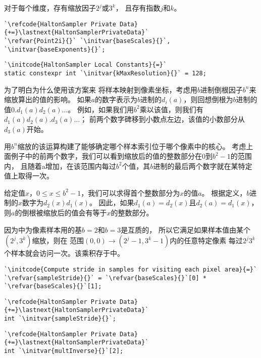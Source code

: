 对于每个维度，存有缩放因子$2^j$或$3^k$，
且存有指数$j$和$k$。
\begin{lstlisting}
`\refcode{HaltonSampler Private Data}{+=}\lastnext{HaltonSamplerPrivateData}`
`\refvar{Point2i}{}` `\initvar{baseScales}{}`, `\initvar{baseExponents}{}`;
\end{lstlisting}
\begin{lstlisting}
`\initcode{HaltonSampler Local Constants}{=}`
static constexpr int `\initvar{kMaxResolution}{}` = 128;
\end{lstlisting}

为了明白为什么使用该方案来
将样本映射到像素坐标，考虑用$b$进制倒根因子$b^n$来缩放算出的值的影响。
如果$a$的数字表示为$b$进制的$d_i(a)$，则回想倒根为$b$进制的值$0.d_1(a)d_2(a)\ldots$。
例如，如果我们用$b^2$乘以该值，则我们有$d_1(a)d_2(a).d_3(a)\ldots$；
前两个数字碑移到小数点左边，该值的小数部分从$d_3(a)$开始。

用$b^n$缩放的该运算构建了能够确定哪个样本索引位于哪个像素中的核心。
考虑上面例子中的前两个数字，我们可以看到缩放后的值的整数部分在0到$b^2-1$的范围内，
且随着a增加，在该范围内每过$b^2$个值，其$b$进制的最后两个数字就在某特定值上取得一次。

给定值$x$，$0\le x\le b^2-1$，我们可以求得首个整数部分为$x$的值$a$。
根据定义，$b$进制的$x$数字为$d_2(x)d_1(x)$。
因此，如果$d_1(a)=d_2(x)$且$d_2(a)=d_1(x)$，
则$a$的倒根被缩放后的值会有等于$x$的整数部分。

因为中为像素样本用的基$b=2$和$b=3$是互质的，
所以它满足如果样本值由某个$(2^j,3^k)$缩放，则在
范围$(0,0)\rightarrow(2^j-1,3^k-1)$内的任意特定像素
每过$2^j3^k$个样本就会访问一次。该乘积存于中。
\begin{lstlisting}
`\initcode{Compute stride in samples for visiting each pixel area}{=}`
`\refvar{sampleStride}{}` = `\refvar{baseScales}{}`[0] * `\refvar{baseScales}{}`[1];
\end{lstlisting}
\begin{lstlisting}
`\refcode{HaltonSampler Private Data}{+=}\lastnext{HaltonSamplerPrivateData}`
int `\initvar{sampleStride}{}`;
\end{lstlisting}
\begin{lstlisting}
`\refcode{HaltonSampler Private Data}{+=}\lastnext{HaltonSamplerPrivateData}`
int `\initvar{multInverse}{}`[2];
\end{lstlisting}

